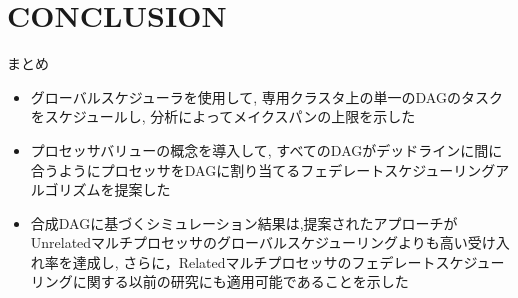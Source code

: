
\section{CONCLUSION}
\label{sec: CONCLUSION}

\begin{frame}{まとめ}
    \begin{itemize}
        \item グローバルスケジューラを使用して, 専用クラスタ上の単一のDAGのタスクをスケジュールし, 分析によってメイクスパンの上限を示した

        \item プロセッサバリューの概念を導入して, すべてのDAGがデッドラインに間に合うようにプロセッサをDAGに割り当てるフェデレートスケジューリングアルゴリズムを提案した

        \item 合成DAGに基づくシミュレーション結果は,提案されたアプローチがUnrelatedマルチプロセッサのグローバルスケジューリングよりも高い受け入れ率を達成し, さらに，Relatedマルチプロセッサのフェデレートスケジューリングに関する以前の研究にも適用可能であることを示した
    \end{itemize}
\end{frame}
